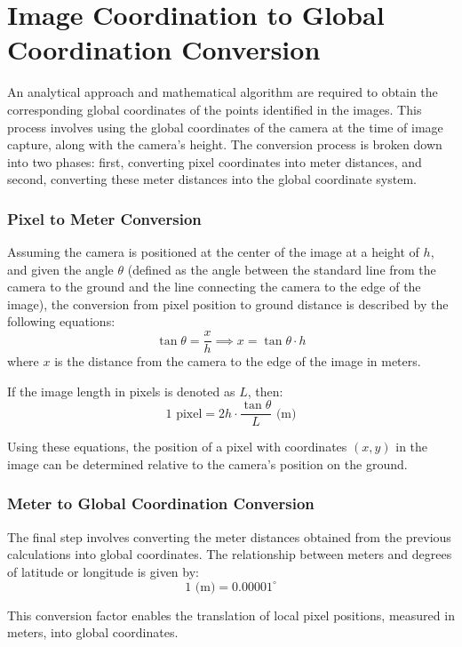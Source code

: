 \documentclass[conference]{IEEEtran}
\begin{document}
\section{Image Coordination to Global Coordination Conversion}
An analytical approach and mathematical algorithm are required to obtain the corresponding global coordinates of the points identified in the images. This process involves using the global coordinates of the camera at the time of image capture, along with the camera's height. The conversion process is broken down into two phases: first, converting pixel coordinates into meter distances, and second, converting these meter distances into the global coordinate system.

\subsubsection{Pixel to Meter Conversion}
Assuming the camera is positioned at the center of the image at a height of \( h \), and given the angle \( \theta \) (defined as the angle between the standard line from the camera to the ground and the line connecting the camera to the edge of the image), the conversion from pixel position to ground distance is described by the following equations:
\[
\tan \theta = \frac{x}{h} \implies x = \tan \theta  \cdot h
\]
where \( x \) is the distance from the camera to the edge of the image in meters.

If the image length in pixels is denoted as \( L \), then:
\[
1 \text{ pixel} = 2h \cdot \frac{\tan \theta}{L} \text{ (m)}
\]

Using these equations, the position of a pixel with coordinates \((x, y)\) in the image can be determined relative to the camera's position on the ground.

\subsubsection{Meter to Global Coordination Conversion}
The final step involves converting the meter distances obtained from the previous calculations into global coordinates. The relationship between meters and degrees of latitude or longitude is given by:
\[
1 \text{ (m)} = 0.00001^\circ
\]

This conversion factor enables the translation of local pixel positions, measured in meters, into global coordinates.
\end{document}
